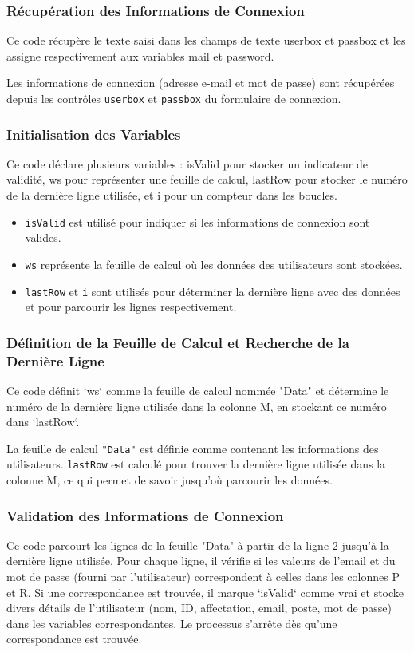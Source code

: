 \documentclass[a4paper, oneside, 12pt, final]{extreport}
\begin{document}
\subsubsection{Récupération des Informations de Connexion}
Ce code récupère le texte saisi dans les champs de texte userbox et passbox et les assigne respectivement aux variables mail et password.

Les informations de connexion (adresse e-mail et mot de passe) sont récupérées depuis les contrôles \texttt{userbox} et \texttt{passbox} du formulaire de connexion.

\subsubsection{Initialisation des Variables}
Ce code déclare plusieurs variables : isValid pour stocker un indicateur de validité, ws pour représenter une feuille de calcul, lastRow pour stocker le numéro de la dernière ligne utilisée, et i pour un compteur dans les boucles.

\begin{itemize}
    \item \texttt{isValid} est utilisé pour indiquer si les informations de connexion sont valides.
    \item \texttt{ws} représente la feuille de calcul où les données des utilisateurs sont stockées.
    \item \texttt{lastRow} et \texttt{i} sont utilisés pour déterminer la dernière ligne avec des données et pour parcourir les lignes respectivement.
\end{itemize}

\subsubsection{Définition de la Feuille de Calcul et Recherche de la Dernière Ligne}
Ce code définit `ws` comme la feuille de calcul nommée "Data" et détermine le numéro de la dernière ligne utilisée dans la colonne M, en stockant ce numéro dans `lastRow`.

La feuille de calcul \texttt{"Data"} est définie comme contenant les informations des utilisateurs. \texttt{lastRow} est calculé pour trouver la dernière ligne utilisée dans la colonne M, ce qui permet de savoir jusqu'où parcourir les données.

\subsubsection{Validation des Informations de Connexion}
Ce code parcourt les lignes de la feuille "Data" à partir de la ligne 2 jusqu'à la dernière ligne utilisée. Pour chaque ligne, il vérifie si les valeurs de l'email et du mot de passe (fourni par l'utilisateur) correspondent à celles dans les colonnes P et R. Si une correspondance est trouvée, il marque `isValid` comme vrai et stocke divers détails de l'utilisateur (nom, ID, affectation, email, poste, mot de passe) dans les variables correspondantes. Le processus s'arrête dès qu'une correspondance est trouvée.
\end{document}
